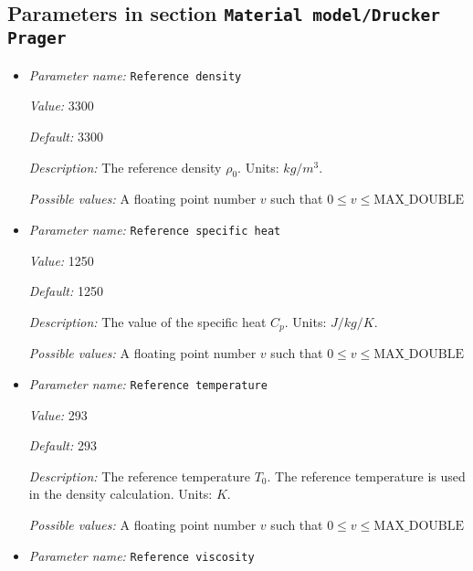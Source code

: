 \subsection{Parameters in section \tt Material model/Drucker Prager}
\label{parameters:Material_20model/Drucker_20Prager}

\begin{itemize}
\item {\it Parameter name:} {\tt Reference density}
\label{parameters:Material model/Drucker Prager/Reference density}
\label{parameters:Material_20model/Drucker_20Prager/Reference_20density}


{\it Value:} 3300


{\it Default:} 3300


{\it Description:} The reference density $\rho_0$. Units: $kg/m^3$.


{\it Possible values:} A floating point number $v$ such that $0 \leq v \leq \text{MAX\_DOUBLE}$
\item {\it Parameter name:} {\tt Reference specific heat}
\label{parameters:Material model/Drucker Prager/Reference specific heat}
\label{parameters:Material_20model/Drucker_20Prager/Reference_20specific_20heat}


{\it Value:} 1250


{\it Default:} 1250


{\it Description:} The value of the specific heat $C_p$. Units: $J/kg/K$.


{\it Possible values:} A floating point number $v$ such that $0 \leq v \leq \text{MAX\_DOUBLE}$
\item {\it Parameter name:} {\tt Reference temperature}
\label{parameters:Material model/Drucker Prager/Reference temperature}
\label{parameters:Material_20model/Drucker_20Prager/Reference_20temperature}


{\it Value:} 293


{\it Default:} 293


{\it Description:} The reference temperature $T_0$. The reference temperature is used in the density calculation. Units: $K$.


{\it Possible values:} A floating point number $v$ such that $0 \leq v \leq \text{MAX\_DOUBLE}$
\item {\it Parameter name:} {\tt Reference viscosity}
\label{parameters:Material model/Drucker Prager/Reference viscosity}
\label{parameters:Material_20model/Drucker_20Prager/Reference_20viscosity}



\end{itemize}
